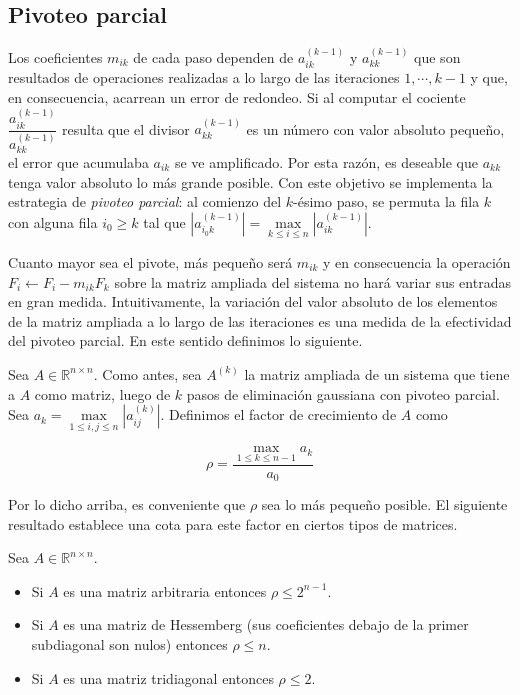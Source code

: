 \subsection{Pivoteo parcial}

Los coeficientes $m_{ik}$ de cada paso dependen de $a_{ik}^{(k - 1)}$ y $a_{kk}^{(k - 1)}$ que son resultados de operaciones realizadas a lo largo de las iteraciones $1, \cdots, k - 1$ y que, en consecuencia, acarrean un error de redondeo. Si al computar el cociente $\dfrac{a_{ik}^{(k - 1)}}{a_{kk}^{(k - 1)}}$ resulta que el divisor $a_{kk}^{(k - 1)}$ es un número con valor absoluto pequeño, el error que acumulaba $a_{ik}$ se ve amplificado. Por esta razón, es deseable que $a_{kk}$ tenga valor absoluto lo más grande posible. Con este objetivo se implementa la estrategia de \emph{pivoteo parcial}: al comienzo del $k$-ésimo paso, se permuta la fila $k$ con alguna fila $i_0 \geq k$ tal que $|a_{i_0k}^{(k - 1)}| = \max\limits_{k \leq i \leq n} |a_{ik}^{(k - 1)}|$.

Cuanto mayor sea el pivote, más pequeño será $m_{ik}$ y en consecuencia la operación  $F_i \leftarrow F_i - m_{ik}F_k$ sobre la matriz ampliada del sistema no hará variar sus entradas en gran medida. Intuitivamente, la variación del valor absoluto de los elementos de la matriz ampliada a lo largo de las iteraciones es una medida de la efectividad del pivoteo parcial. En este sentido definimos lo siguiente.

\begin{defi}
Sea $A \in \mathbb{R}^{n \times n}$. Como antes, sea $A^{(k)}$ la matriz ampliada de un sistema que tiene a $A$ como matriz, luego de $k$ pasos de eliminación gaussiana con pivoteo parcial. Sea $a_k = \max\limits_{1 \leq i, j \leq n} |a_{ij}^{(k)}|$. Definimos el factor de crecimiento de $A$ como

\[
\rho = \frac{\max\limits_{1\leq k \leq n - 1}a_k}{a_0}
\]
\end{defi}

Por lo dicho arriba, es conveniente que $\rho$ sea lo más pequeño posible. El siguiente resultado establece una cota para este factor en ciertos tipos de matrices.

\begin{propo} Sea $A \in \mathbb{R}^{n \times n}$.
\begin{itemize}
\item Si $A$ es una matriz arbitraria entonces $\rho \leq 2^{n - 1}$.
\item Si $A$ es una matriz de Hessemberg (sus coeficientes debajo de la primer subdiagonal son nulos) entonces $\rho \leq n$.
\item Si $A$ es una matriz tridiagonal entonces $\rho \leq 2$.
\end{itemize}
\end{propo}

